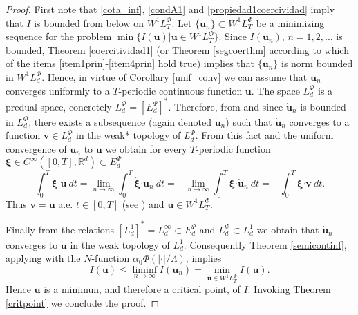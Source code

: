 \documentclass[twoside]{article}
\theoremstyle{remark}
\newcommand{\lphi}{L^{\Phi}}
\newcommand{\wphi}{W^{1}\lphi}
\renewcommand{\b}[1]{\boldsymbol{#1}}
\newcommand{\rr}{\mathbb{R}}
\newcommand{\ccdot}{\b{\cdot}}
\renewcommand{\leq}{\leqslant}
\newcommand{\epsi}{E^{\Psi}}
\begin{document}
\begin{proof} First note that  \eqref{cota_inf}, \eqref{condA1} and \eqref{propiedad1coercividad} imply that $I$ is bounded from below on $\wphi_T$. Let $\{\b{u}_n\}\subset \wphi_T$ be a  minimizing sequence for the problem  $\min\{I(\b{u})|\b{u}\in\wphi_T\}$.
Since  $I(\b{u}_n)$, $n=1,2,\ldots$  is bounded, Theorem \ref{coercitividad1} (or Theorem \ref{segcoerthm} according to which of the items \ref{item1prin}-\ref{item4prin} hold true) implies that $\{\b{u}_n\}$ is norm bounded in $\wphi_d$. Hence, in virtue of Corollary \ref{unif_conv} we can assume that $\b{u}_n$ converges uniformly to a $T$-periodic continuous function $\b{u}$.  The space  $\lphi_d$ is a predual space, concretely $\lphi_d=\left[\epsi_d\right]^*$. Therefore, from \cite[Cor. 5, p. 148]{rao1991theory} and since $\b{\dot{u}}_n$ is bounded in $\lphi_d$,  there exists a subsequence (again denoted $\b{\dot{u}}_n$) such that $\b{\dot{u}}_n$ converges to a function $\b{v}\in\lphi_d$ in the weak* topology of $\lphi_d$. From this fact and the uniform convergence of $\b{u}_n$ to $\b{u}$ we obtain for every $T$-periodic function $\b{\xi}\in C^{\infty}([0,T],\rr^d)\subset\epsi_d$
\[
\int_0^T\b{\dot{\xi}}\ccdot\b{u}\ dt=\lim_{n\to\infty}\int_0^T\b{\dot{\xi}}\ccdot\b{u}_n \ dt=-\lim_{n\to\infty}\int_0^T\b{\xi}\ccdot\b{\dot{u}}_n\ dt=-\int_0^T\b{\xi}\ccdot\b{v}\ dt.
\]
Thus $\b{v}=\b{\dot{u}}$ a.e. $t\in [0,T]$ (see \cite[p. 6]{mawhin2010critical}) and $\b{u}\in\wphi_T$.

Finally from the relations $\left[L^1_d\right]^*=L^{\infty}_d\subset  \epsi_d$ and $\lphi_d\subset L^1_d$ we obtain that $\b{\dot{u}}_n$ converges to $\b{\dot{u}}$ in the weak topology of $L^1_d$. Consequently Theorem \ref{semicontinf}, applying with the $N$-function $\alpha_0\Phi\left(|\ccdot|/\Lambda\right)$, implies 
\[I(\b{u})\leq  \liminf_{n\to\infty}I(\b{u}_n)=\min\limits_{\b{u}\in\wphi_T}I(\b{u}).\]
Hence $\b{u}$ is a minimun, and therefore a critical point, of $I$. Invoking Theorem \ref{critpoint} we conclude the proof.\end{proof}

\printbibliography
\end{document}
